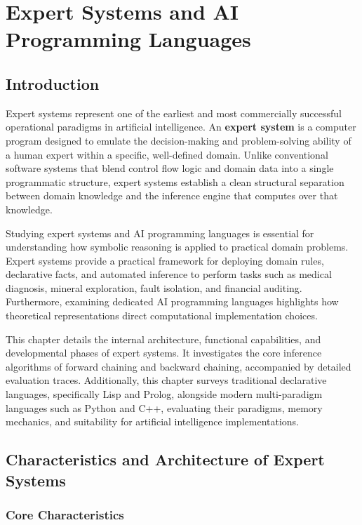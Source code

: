 \documentclass[12pt]{report}
\begin{document}
\pagestyle{plain}
\setcounter{chapter}{5}
\chapter{Expert Systems and AI Programming Languages}

\section{Introduction}

Expert systems represent one of the earliest and most commercially successful operational paradigms in artificial intelligence. An \textbf{expert system} is a computer program designed to emulate the decision-making and problem-solving ability of a human expert within a specific, well-defined domain. Unlike conventional software systems that blend control flow logic and domain data into a single programmatic structure, expert systems establish a clean structural separation between domain knowledge and the inference engine that computes over that knowledge.

Studying expert systems and AI programming languages is essential for understanding how symbolic reasoning is applied to practical domain problems. Expert systems provide a practical framework for deploying domain rules, declarative facts, and automated inference to perform tasks such as medical diagnosis, mineral exploration, fault isolation, and financial auditing. Furthermore, examining dedicated AI programming languages highlights how theoretical representations direct computational implementation choices.

This chapter details the internal architecture, functional capabilities, and developmental phases of expert systems. It investigates the core inference algorithms of forward chaining and backward chaining, accompanied by detailed evaluation traces. Additionally, this chapter surveys traditional declarative languages, specifically Lisp and Prolog, alongside modern multi-paradigm languages such as Python and C++, evaluating their paradigms, memory mechanics, and suitability for artificial intelligence implementations.

\section{Characteristics and Architecture of Expert Systems}

\subsection{Core Characteristics}
\end{document}
